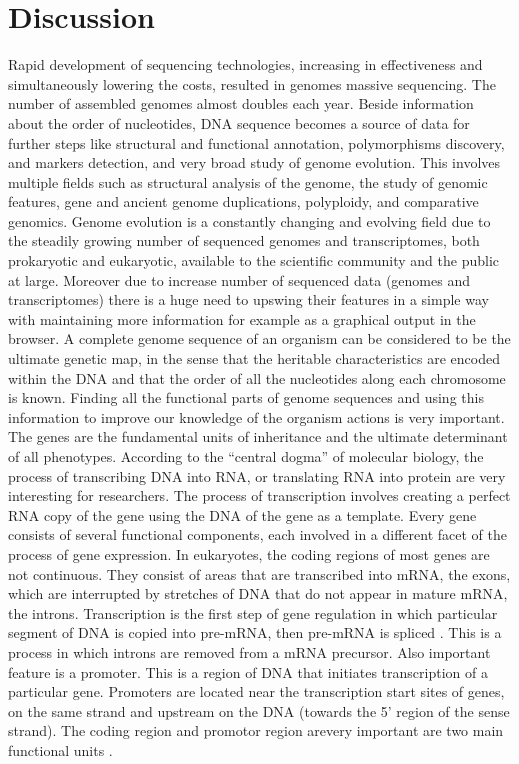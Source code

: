 \documentclass[]{spie}
\begin{document}
\section{Discussion}

Rapid development of sequencing technologies, increasing in effectiveness and simultaneously lowering the costs, resulted in genomes massive sequencing.
The number of assembled genomes almost doubles each year.
Beside information about the order of nucleotides,
DNA sequence becomes a source of data for further steps like structural and functional annotation, polymorphisms discovery, and markers detection, and very broad study of genome evolution. This involves multiple fields such as structural analysis of the genome, the study of genomic features, gene and ancient genome duplications, polyploidy, and comparative genomics. Genome evolution is a constantly changing and evolving field due to the steadily growing number of sequenced genomes and transcriptomes, both prokaryotic and eukaryotic, available to the scientific community and the public at large.
Moreover due to increase  number of sequenced data  (genomes and transcriptomes) there is a huge need to upswing their features in a simple way with maintaining more information for example as a graphical output in the browser. A complete genome sequence of an organism can be considered to be the ultimate genetic map, in the sense that the heritable characteristics are encoded within the DNA and that the order of all the nucleotides along each chromosome is known. Finding all the functional parts of genome sequences and using this information to improve our knowledge of the  organism actions is very important. The genes are the fundamental units of inheritance and the ultimate determinant of all phenotypes. According to the “central dogma” of molecular biology, the process of transcribing DNA into RNA, or translating RNA into protein are very interesting for  researchers. The process of transcription involves creating a perfect RNA copy of the gene using the DNA of the gene as a template. Every gene consists of several functional components, each involved in a different facet of the process of gene expression. In eukaryotes, the coding regions of most genes are not continuous. They consist of areas that are transcribed into mRNA, the exons, which are interrupted by stretches of DNA that do not appear in mature mRNA, the introns. Transcription is the first step of gene regulation in which particular segment of DNA is copied into pre-mRNA, then pre-mRNA is spliced \cite{chen2009mechanisms}. This is a process in which introns are removed from a mRNA precursor. Also important feature is a promoter. This is a region of DNA that initiates transcription of a particular gene. Promoters are located near the transcription start sites of genes, on the same strand and upstream on the DNA (towards the 5' region of the sense strand). The coding region and promotor region arevery important are two main functional units \cite{pawelkowicz2016next}.
\end{document}
